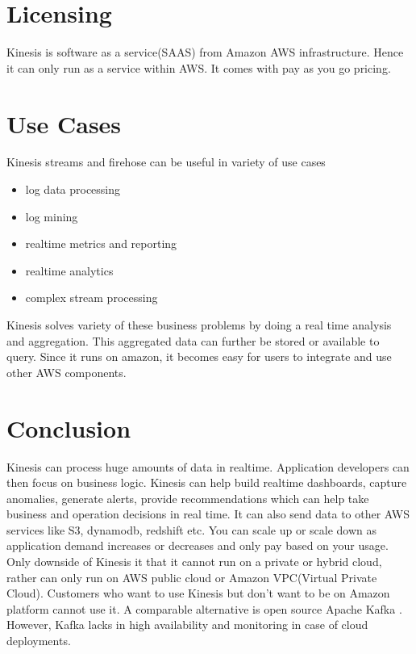 \documentclass[9pt,twocolumn,twoside]{../../styles/osajnl}
\begin{document}
\section{Licensing}
Kinesis is software as a service(SAAS) from Amazon AWS infrastructure. Hence it
can only run as a service within AWS. It comes with pay as you go pricing.
\TE
{}

\section{Use Cases}
Kinesis streams \cite{www-kinesis} and firehose can be useful in variety of use
cases
\begin{itemize}
	\item log data processing
	\item log mining
	\item realtime metrics and reporting
	\item realtime analytics
	\item complex stream processing
\end{itemize}
Kinesis solves variety of these business problems by doing a real time analysis
and aggregation. This aggregated data can further be stored or available to
query. Since it runs on amazon, it becomes easy for users to integrate and use
other AWS components.

\section{Conclusion}
Kinesis can process huge amounts of data in realtime. Application developers can
then focus on business logic. Kinesis \cite{varia2014overview} can help build
realtime dashboards, capture anomalies, generate alerts, provide recommendations
which can help take business and operation decisions in real time. It can also
send data to other AWS services like S3, dynamodb, redshift etc. You can scale
up or scale down as application demand increases or decreases and only pay based
on your usage. Only downside of Kinesis it that it cannot run on a private or
hybrid cloud, rather can only run on AWS public cloud or Amazon VPC(Virtual
Private Cloud).  \CE Customers who want to use Kinesis but don't want to be on
Amazon platform cannot use it. A comparable alternative is open source Apache
Kafka \cite{deyhim2016kafka} .  However, Kafka lacks in high availability and
monitoring in case of cloud deployments.
\end{document}
